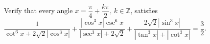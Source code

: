 Verify that every angle $x = \dfrac{\pi}{4} + \dfrac{k \pi}{2}$, $k\in\mathbb Z$, satisfies $\dfrac{1}{\cot^6x+2\sqrt2|\cos^3x|} + \dfrac{|\cos^3x|\csc^6x}{|\sec^3x|+2\sqrt2} + \dfrac{2\sqrt2|\sin^3x|}{|\tan^3x|+|\cot^3x|} = \dfrac{3}{2}$.
